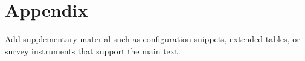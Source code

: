 \appendix

\section{Appendix}

Add supplementary material such as configuration snippets, extended tables, or survey instruments that support the main text.
